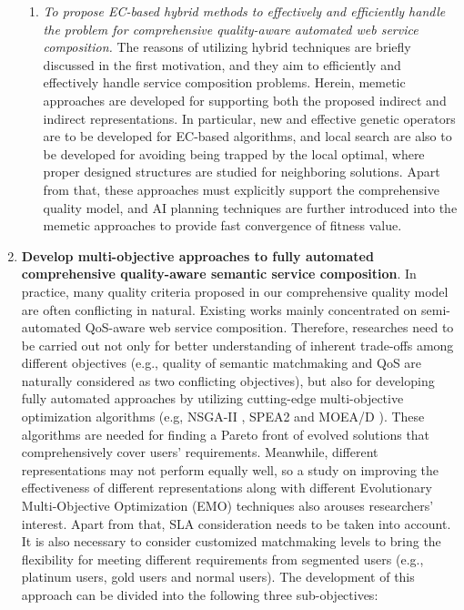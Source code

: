 \begin{enumerate}
\begin{enumerate}
    \item \emph{To propose EC-based hybrid methods to effectively and efficiently handle the problem for comprehensive quality-aware automated web service composition.} The reasons of utilizing hybrid techniques are briefly discussed in the first motivation, and they aim to efficiently and effectively handle service composition problems. Herein, memetic approaches are developed for supporting both the proposed indirect and indirect representations. In particular, new and effective genetic operators are to be developed for EC-based algorithms, and local search are also to be developed for avoiding being trapped by the local optimal, where proper designed structures are studied for neighboring solutions. Apart from that, these approaches must explicitly support the comprehensive quality model, and AI planning techniques are further introduced into the memetic approaches to provide fast convergence of fitness value.
  \end{enumerate}
 
 \item \label{Obj:2} \textbf{Develop multi-objective approaches to fully automated comprehensive quality-aware semantic service composition}. In practice, many quality criteria proposed in our comprehensive quality model are often conflicting in natural. Existing works \cite{chen2014partial,xiang2014qos,yin2014hybrid,liu2005dynamic,yu2013efficient,zhang2010qos} mainly concentrated on semi-automated QoS-aware web service composition. Therefore, researches need to be carried out not only for better understanding of inherent trade-offs among different objectives (e.g., quality of semantic matchmaking and QoS are naturally considered as two conflicting objectives), but also for developing fully automated approaches by utilizing cutting-edge multi-objective optimization algorithms (e.g, NSGA-II \cite{deb2002fast}, SPEA2 \cite{zitzler2001spea2} and MOEA/D \cite{zhang2007moea}). These algorithms are needed for finding a Pareto front of evolved solutions that comprehensively cover users' requirements. Meanwhile, different representations may not perform equally well, so a study on improving the effectiveness of different representations along with different Evolutionary Multi-Objective Optimization (EMO) techniques also arouses researchers' interest. Apart from that, SLA consideration needs to be taken into account. It is also necessary to consider customized matchmaking levels to bring the flexibility for meeting different requirements from segmented users (e.g., platinum users, gold users and normal users). The development of this approach can be divided into the following three sub-objectives:
   \begin{enumerate}
   

\end{enumerate}
\end{enumerate}
